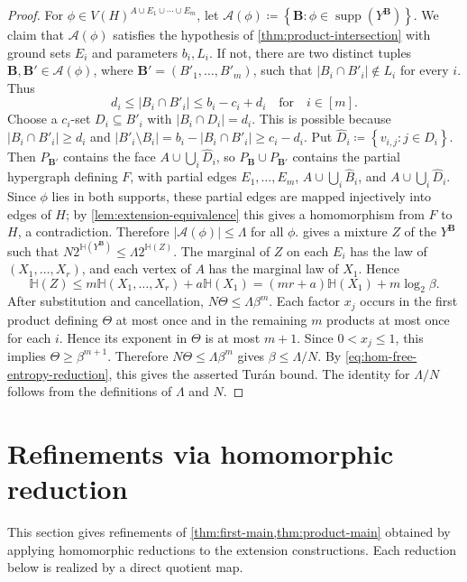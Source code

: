 \documentclass[10pt,a4paper]{article}
\theoremstyle{plain}
\theoremstyle{definition}
\theoremstyle{plain}
\DeclareMathOperator{\supp}{supp}
\newcommand{\calA}{\mathcal A}
\newcommand{\HH}{\mathbb H}
\begin{document}
\begin{proof}
For $\phi\in V(H)^{A\cup E_1\cup\cdots\cup E_m}$, let $\calA(\phi)\coloneqq\left\{\mathbf B:\phi\in\supp(Y^{\mathbf B})\right\}$.  We claim that $\calA(\phi)$ satisfies the hypothesis of \cref{thm:product-intersection} with ground sets $E_i$ and parameters $b_i,L_i$.  If not, there are two distinct tuples $\mathbf B,\mathbf B'\in\calA(\phi)$, where $\mathbf B'=(B'_1,\ldots,B'_m)$, such that $|B_i\cap B'_i|\notin L_i$ for every $i$.  Thus
\[
        d_i\le |B_i\cap B'_i|\le b_i-c_i+d_i
        \quad\text{for}\quad i\in[m].
\]
Choose a $c_i$-set $D_i\subseteq B'_i$ with $|B_i\cap D_i|=d_i$.  This is possible because $|B_i\cap B'_i|\ge d_i$ and $|B'_i\setminus B_i|=b_i-|B_i\cap B'_i|\ge c_i-d_i$.  Put $\hat{D}_i\coloneqq\left\{v_{i,j}:j\in D_i\right\}$.  Then $P_{\mathbf B'}$ contains the face $A\cup\bigcup_i\hat{D}_i$, so $P_{\mathbf B}\cup P_{\mathbf B'}$ contains the partial hypergraph defining $F$, with partial edges $E_1,\ldots,E_m$, $A\cup\bigcup_i\hat{B}_i$, and $A\cup\bigcup_i\hat{D}_i$.  Since $\phi$ lies in both supports, these partial edges are mapped injectively into edges of $H$; by \cref{lem:extension-equivalence} this gives a homomorphism from $F$ to $H$, a contradiction.  Therefore $|\calA(\phi)|\le\Lambda$ for all $\phi$. 
 gives a mixture $Z$ of the $Y^{\mathbf B}$ such that $N2^{\HH(Y^{\mathbf B})}\le\Lambda2^{\HH(Z)}$. 
The marginal of $Z$ on each $E_i$ has the law of $(X_1,\ldots,X_r)$, and each vertex of $A$ has the marginal law of $X_1$.  Hence
\[
        \HH(Z)\le m\HH(X_1,\ldots,X_r)+a\HH(X_1)
        =(mr+a)\HH(X_1)+m\log_2\beta.
\]
After substitution and cancellation, $N\Theta\le\Lambda\beta^m$. 
Each factor $x_j$ occurs in the first product defining $\Theta$ at most once and in the remaining $m$ products at most once for each $i$.  Hence its exponent in $\Theta$ is at most $m+1$.  Since $0<x_j\le1$, this implies $\Theta\ge\beta^{m+1}$.  Therefore $N\Theta\le\Lambda\beta^m$ gives $\beta\le\Lambda/N$.
By \cref{eq:hom-free-entropy-reduction}, this gives the asserted Tur\'an bound.  The identity for $\Lambda/N$ follows from the definitions of $\Lambda$ and $N$.
\end{proof}

\section{Refinements via homomorphic reduction}\label{sec:hom-reductions}

This section gives refinements of \cref{thm:first-main,thm:product-main} obtained by applying homomorphic reductions to the extension constructions.  Each reduction below is realized by a direct quotient map.
\end{document}

